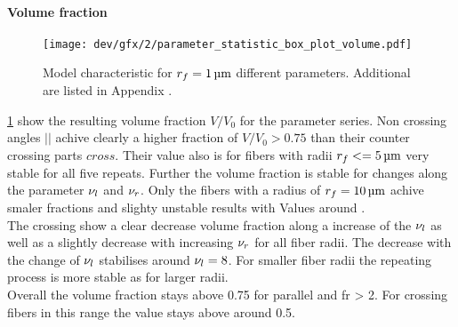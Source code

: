 \paragraph{Volume fraction}
% 
\begin{figure}[p]
\centering
\texttt{[image: dev/gfx/2/parameter\_statistic\_box\_plot\_volume.pdf]}
\caption[Model characteristics]{Model characteristic for $\fiberRadius = \SI{1}{\micro\meter}$ different parameters. Additional \fiberRadius are listed in Appendix \dummy{}. }
\label{fig:psbp1}
\end{figure}
% 
\cref{fig:psbp1} show the resulting volume fraction $V/V_0$ for the parameter series.
Non crossing angles $||$ achive clearly a higher fraction of $V/V_0 > 0.75$ than their counter crossing parts $cross$.
Their value also is for fibers with radii $\fiberRadius <= \SI{5}{\micro\meter}$ very stable for all five repeats.
Further the volume fraction is stable for changes along the parameter $\textnormal{$\nu_{l}$}$ and $\textnormal{$\nu_{r}$}$. 
Only the fibers with a radius of $\fiberRadius = \SI{10}{\micro\meter}$ achive smaler fractions and slighty unstable results with Values around \dummy{}.
\\
The crossing \dummy{} show a clear decrease volume fraction along a increase of the $\textnormal{$\nu_{l}$}$ as well as a slightly decrease with increasing $\textnormal{$\nu_{r}$}$ for all fiber radii.
The decrease with the change of $\textnormal{$\nu_{l}$}$ stabilises around $\textnormal{$\nu_{l}$} = \num{8}$.
For smaller fiber radii the repeating process is more stable as for larger radii.
\\
Overall the volume fraction stays above 0.75 for parallel and fr > 2.
For crossing fibers in this range the value stays above around 0.5.
% 

